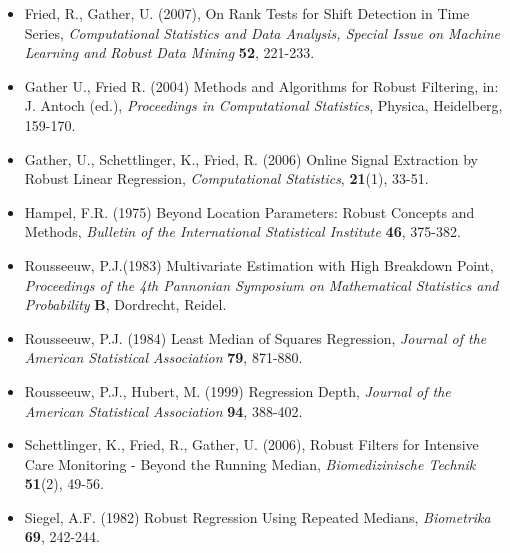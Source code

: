 \documentclass[a4paper]{scrartcl}
\begin{document}
\begin{itemize}
\item
Fried, R., Gather, U. (2007), On Rank Tests for Shift
Detection in Time Series, \emph{Computational Statistics and Data
Analysis, Special Issue on Machine Learning and Robust Data
Mining} \textbf{52}, 221-233.

\item Gather U., Fried R. (2004) Methods and Algorithms for Robust
Filtering, in: J. Antoch (ed.), \emph{Proceedings in Computational
Statistics}, Physica, Heidelberg,  159-170.

\item Gather, U., Schettlinger, K., Fried, R. (2006) Online Signal
Extraction by Robust Linear Regression, \emph{Computational
Statistics}, \textbf{21}(1), 33-51.

\item
Hampel, F.R. (1975) Beyond Location Parameters: Robust Concepts
and Methods, \emph{Bulletin of the International Statistical
Institute} \textbf{46}, 375-382.

\item
Rousseeuw, P.J.(1983) Multivariate Estimation with High Breakdown
Point, \emph{Proceedings of the 4th Pannonian Symposium on Mathematical
Statistics and Probability} \textbf{B}, Dordrecht, Reidel.

\item Rousseeuw, P.J. (1984) Least Median of Squares Regression,
\emph{Journal of the American Statistical Association} \textbf{79}, 871-880.

\item
Rousseeuw, P.J., Hubert, M. (1999) Regression Depth, \emph{Journal of the
American Statistical Association} \textbf{94}, 388-402.

\item
Schettlinger, K., Fried, R., Gather, U. (2006), Robust Filters
for Intensive Care Monitoring - Beyond the Running Median,
\emph{Biomedizinische Technik} \textbf{51}(2), 49-56.

\item
Siegel, A.F. (1982) Robust Regression Using Repeated
Medians, \emph{Biometrika} \textbf{69}, 242-244.
\end{itemize}
\end{document}
